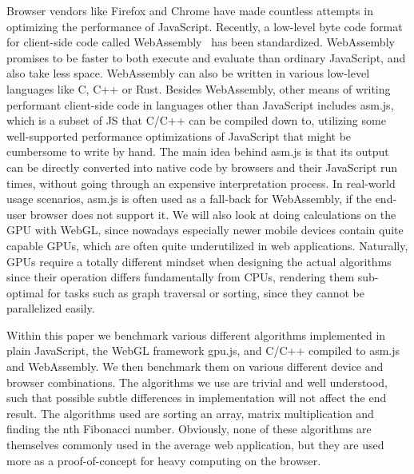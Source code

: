 \documentclass[conference]{IEEEtran}
\begin{document}
Browser vendors like Firefox and Chrome have made countless attempts in
optimizing the performance of JavaScript. Recently, a low-level byte code format
for client-side code called WebAssembly~\cite{wasmspeed} has been standardized. WebAssembly
promises to be faster to both execute and evaluate than ordinary JavaScript,
and also take less space. WebAssembly can also be written in various low-level
languages like C, C++ or Rust. Besides WebAssembly, other means of writing
performant client-side code in languages other than JavaScript includes asm.js,
which is a subset of JS that C/C++ can be compiled down to, utilizing some
well-supported performance optimizations of JavaScript that might be cumbersome
to write by hand. The main idea behind asm.js is that its output can be
directly converted into native code by browsers and their JavaScript run times,
without going through an expensive interpretation process. In real-world usage
scenarios, asm.js is often used as a fall-back for WebAssembly, if the end-user
browser does not support it. We will also look at doing calculations on the
GPU with WebGL, since nowadays especially newer mobile devices contain quite
capable GPUs, which are often quite underutilized in web applications.
Naturally, GPUs require a totally different mindset when designing the actual
algorithms since their operation differs fundamentally from CPUs, rendering
them sub-optimal for tasks such as graph traversal or sorting, since they cannot
be parallelized easily.

Within this paper we benchmark various different algorithms implemented in
plain JavaScript, the WebGL framework gpu.js, and C/C++ compiled to asm.js and
WebAssembly. We then benchmark them on various different device and browser
combinations. The algorithms we use are trivial and well understood, such that
possible subtle differences in implementation will not affect the end result.
The algorithms used are sorting an array, matrix multiplication and finding the
nth Fibonacci number. Obviously, none of these algorithms are themselves
commonly used in the average web application, but they are used more as a
proof-of-concept for heavy computing on the browser.
\end{document}
